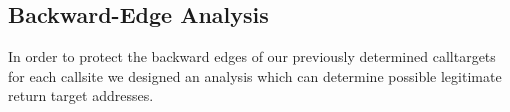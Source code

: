 % 


\subsection{Backward-Edge Analysis}
\label{Backward Edge Analysis}
In order to protect the backward edges of our previously 
determined calltargets for each callsite we designed an
analysis which can determine possible legitimate return target addresses.

